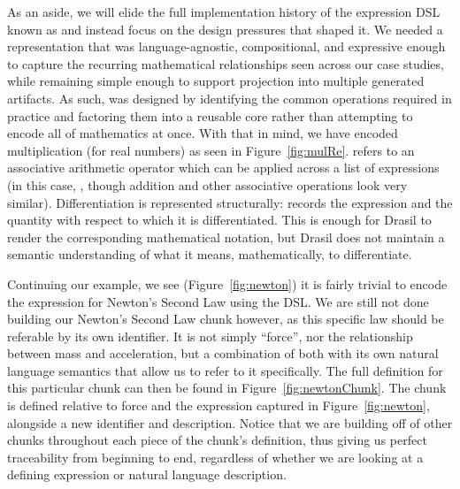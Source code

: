 As an aside, we will elide the full implementation history of the expression 
DSL known as  and instead focus on the design pressures that 
shaped it. We needed a representation that was language-agnostic, 
compositional, and expressive enough to capture the recurring mathematical 
relationships seen across our case studies, while remaining simple enough to 
support projection into multiple generated artifacts. As such,  
was designed by identifying the common operations required in practice and 
factoring them into a reusable core rather than attempting to encode all of 
mathematics at once. With that in mind, 
we have encoded multiplication (for real numbers) as seen in 
Figure~\ref{fig:mulRe}.  refers to an associative arithmetic 
operator which can be applied across a list of expressions (in this case, 
, though addition and other associative operations look very 
similar). Differentiation is represented structurally:  records the 
expression  and the quantity  with respect to which it is 
differentiated. This is enough for Drasil to render the corresponding 
mathematical notation, but Drasil does not maintain a semantic understanding of
what it means, mathematically, to differentiate.


Continuing our example, we see (Figure~\ref{fig:newton}) it is fairly trivial 
to encode the expression for Newton's Second Law using the  DSL. We 
are still not done building our Newton's Second Law chunk however, as this 
specific law should be referable by its own identifier. It is not simply 
``force'', nor the relationship between mass and acceleration, but a combination
of both with its own natural language semantics that allow us to refer to it 
specifically. The full definition for this particular chunk can then be found 
in Figure~\ref{fig:newtonChunk}. The chunk is defined relative to force and the 
expression captured in Figure~\ref{fig:newton}, alongside a new identifier and 
description. Notice that we are building off of other chunks throughout each 
piece of the chunk's definition, thus giving us perfect traceability from 
beginning to end, regardless of whether we are looking at a defining expression 
or natural language description.


